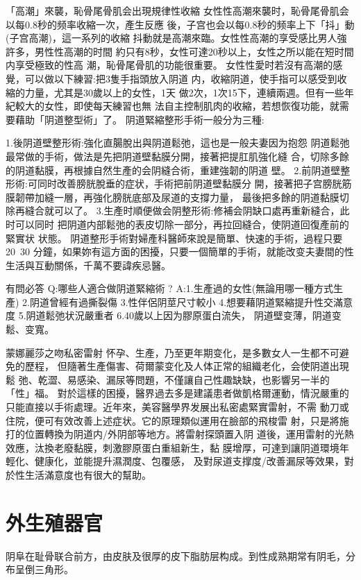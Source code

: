 \documentclass[12pt,UTF8]{ctexbook}
\begin{document}
「高潮」來襲，恥骨尾骨肌会出現規律性收縮
女性性高潮來襲时，恥骨尾骨肌会以每0.8秒的频率收縮一次，產生反應
後，子宫也会以每0.8秒的频率上下「抖」動(子宫高潮)，這一系列的收縮
抖動就是高潮來臨。女性性高潮的享受感比男人強許多，男性性高潮的时間
約只有8秒，女性可達20秒以上，女性之所以能在短时間内享受極致的性高
潮，恥骨尾骨肌的功能很重要。
女性性愛时若沒有高潮的感覺，可以做以下練習:把3隻手指頭放入阴道
内，收縮阴道，使手指可以感受到收縮的力量，尤其是30歲以上的女性，1天
做2次，1次15下，連續兩週。但有一些年紀較大的女性，即使每天練習也無
法自主控制肌肉的收縮，若想恢復功能，就需要藉助「阴道整型術」了。
阴道緊縮整形手術一般分为三種:

1.後阴道壁整形術:強化直腸脫出與阴道鬆弛，這也是一般夫妻因为抱怨
阴道鬆弛最常做的手術，做法是先把阴道壁黏膜分開，接著把提肛肌強化縫
合，切除多餘的阴道黏膜，再根據自然生產的会阴縫合術，重建強韌的阴道
壁。
2.前阴道壁整形術:可同时改善膀胱脫垂的症状，手術把前阴道壁黏膜分
開，接著把子宫膀胱筋膜韌帶加縫一層，再強化膀胱底部及尿道的支撐力量，
最後把多餘的阴道黏膜切除再縫合就可以了。
3.生產时順便做会阴整形術:修補会阴缺口處再重新縫合，此时可以同时
把阴道内部鬆弛的表皮切除一部分，再拉回縫合，使阴道回復產前的緊實状
状態。
阴道整形手術對婦產科醫師來說是簡單、快速的手術，過程只要20~30
分鐘，如果妳有這方面的困擾，只要一個簡單的手術，就能改变夫妻間的性
生活與互動關係，千萬不要諱疾忌醫。

有問必答
Q:哪些人適合做阴道緊縮術 ?
A:1.生產過的女性(無論用哪一種方式生產)
2.阴道曾經有過撕裂傷
3.性伴侶阴莖尺寸較小
4.想要藉阴道緊縮提升性交滿意度
5.阴道鬆弛状況嚴重者
6.40歲以上因为膠原蛋白流失，
阴道壁变薄，阴道变鬆、变寬。

蒙娜麗莎之吻私密雷射
怀孕、生產，乃至更年期变化，是多數女人一生都不可避免的歷程，
但隨著生產傷害、荷爾蒙变化及人体正常的組織老化，会使阴道出現鬆
弛、乾澀、易感染、漏尿等問題，不僅讓自己性趣缺缺，也影響另一半的
「性」福。
對於這樣的困擾，醫界過去多是建議患者做凱格爾運動，情況嚴重的
只能直接以手術處理。近年來，美容醫學界发展出私密處緊實雷射，不需
動刀或住院，便可有效改善上述症状。它的原理類似運用在臉部的飛梭雷
射，只是將施打的位置轉換为阴道内/外阴部等地方。將雷射探頭置入阴
道後，運用雷射的光熱效應，汰換老廢黏膜，刺激膠原蛋白重組新生，黏
膜增厚，可達到讓阴道環境年輕化、健康化，並能提升濕潤度、包覆感，
及對尿道支撑度/改善漏尿等效果，對於性生活滿意度也有很大的幫助。

\section{外生殖器官}

阴阜在耻骨联合前方，由皮肤及很厚的皮下脂肪层构成。到性成熟期常有阴毛，分布呈倒三角形。
\end{document}
